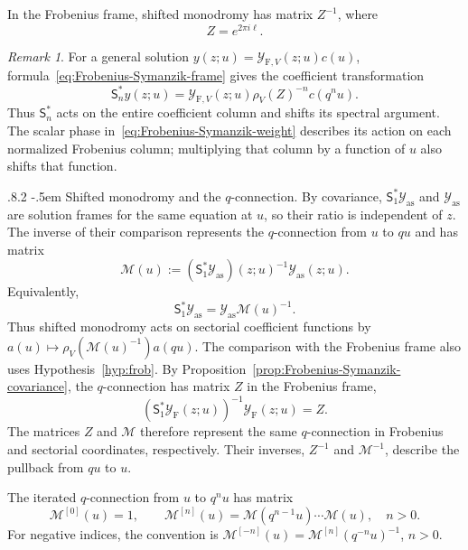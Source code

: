 \documentclass[11pt,leqno]{amsart}
\makeatletter
\numberwithin{equation}{section}
\renewcommand\paragraph{\@startsection{paragraph}{4}{\z@}%
  {.8\baselineskip \@plus .2\baselineskip}%
  {-.5em}%
  {\normalfont\normalsize\bfseries}}
\theoremstyle{plain}
\theoremstyle{definition}
\theoremstyle{plain}
\theoremstyle{definition}
\theoremstyle{remark}
\newtheorem{remark}[theorem]{Remark}
\makeatother
\begin{document}
In the Frobenius frame, shifted monodromy has matrix $Z^{-1}$, where
\[
 Z=e^{2\pi i\ell}.
\]

\begin{remark}\label{rem:Frobenius-eigenvector-vs-general-solution}
For a general solution $y(z;u)=\mathcal Y_{\mathrm F,V}(z;u)c(u)$, formula~\eqref{eq:Frobenius-Symanzik-frame} gives the coefficient transformation
\[
 \mathsf S_n^*y(z;u)=\mathcal Y_{\mathrm F,V}(z;u)\rho_V(Z)^{-n} c(q^nu).
\]
Thus $\mathsf S_n^*$ acts on the entire coefficient column and shifts its spectral argument.  The scalar phase in~\eqref{eq:Frobenius-Symanzik-weight} describes its action on each normalized Frobenius column; multiplying that column by a function of $u$ also shifts that function.
\end{remark}

\paragraph{Shifted monodromy and the $q$-connection.}
By covariance, $\mathsf S_1^*\mathcal Y_{\mathrm{as}}$ and $\mathcal Y_{\mathrm{as}}$ are solution frames for the same equation at $u$, so their ratio is independent of $z$.  The inverse of their comparison represents the $q$-connection from $u$ to $qu$ and has matrix
\begin{equation}\label{eq:infinity-frame-transition}
 \mathscr M(u):=(\mathsf S_1^*\mathcal Y_{\mathrm{as}})(z;u)^{-1}
                    \mathcal Y_{\mathrm{as}}(z;u).
\end{equation}
Equivalently,
\[
 \mathsf S_1^*\mathcal Y_{\mathrm{as}}
 =\mathcal Y_{\mathrm{as}}\mathscr M(u)^{-1}.
\]
Thus shifted monodromy acts on sectorial coefficient functions by $a(u)\mapsto\rho_V(\mathscr M(u)^{-1})a(qu)$.  The comparison with the Frobenius frame also uses Hypothesis~\ref{hyp:frob}.  By Proposition~\ref{prop:Frobenius-Symanzik-covariance}, the $q$-connection has matrix $Z$ in the Frobenius frame,
\[
 (\mathsf S_1^*\mathcal Y_{\mathrm F}(z;u))^{-1}
       \mathcal Y_{\mathrm F}(z;u)=Z.
\]
The matrices $Z$ and $\mathscr M$ therefore represent the same $q$-connection in Frobenius and sectorial coordinates, respectively.  Their inverses, $Z^{-1}$ and $\mathscr M^{-1}$, describe the pullback from $qu$ to $u$.

The iterated $q$-connection from $u$ to $q^nu$ has matrix
\begin{equation}\label{eq:infinity-frame-iterate}
 \mathscr M^{[0]}(u)=1,\qquad
 \mathscr M^{[n]}(u)
 =\mathscr M(q^{n-1}u)\cdots\mathscr M(u),
 \quad n>0.
\end{equation}
For negative indices, the convention is $\mathscr M^{[-n]}(u)=\mathscr M^{[n]}(q^{-n}u)^{-1}$, $n>0$.
\end{document}
